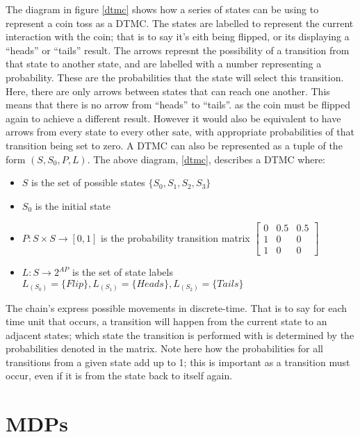 \documentclass{l4proj}
\begin{document}
The diagram in figure \ref{dtmc} shows how a series of states can be using to represent a coin toss as a DTMC. The states are labelled to represent the current interaction with the coin; that is to say it's eith being flipped, or its displaying a ``heads'' or ``tails'' result. The arrows represnt the possibility of a transition from that state to another state, and are labelled with a number representing a probability. These are the probabilities that the state will select this transition.\\
Here, there are only arrows between states that can reach one another. This means that there is no arrow from ``heads'' to ``tails''. as the coin must be flipped again to achieve a different result. However it would also be equivalent to have arrows from every state to every other sate, with appropriate probabilities of that transition being set to zero.
A DTMC can also be represented as a tuple of the form $(S, S{_0}, P, L)$. The above diagram, \ref{dtmc}, describes a DTMC where:
\begin{itemize}
\item{$S$ is the set of possible states $\lbrace S_0, S_1, S_2, S_3 \rbrace $}
\item{$S{_0}$ is the initial state}
\item{$P : S \times S \rightarrow [0,1]$ is the probability transition matrix $\begin{bmatrix}
0 & 0.5 & 0.5\\ 
1 & 0 & 0\\ 
1 & 0 & 0
\end{bmatrix}$}
\item{$L : S \rightarrow 2^{AP}$ is the set of state labels $L_{(S_0)}=\lbrace Flip \rbrace , L_{(S_1)}=\lbrace Heads \rbrace , L_{(S_2)}=\lbrace Tails \rbrace$}
\end{itemize}

The chain's express possible movements in discrete-time. That is to say for each time unit that occurs, a transition will happen from the current state to an adjacent states; which state the transition is performed with is determined by the probabilities denoted in the matrix. Note here how the probabilities for all transitions from a given state add up to 1; this is important as a transition must occur, even if it is from the state back to itself again. 


\section{MDPs}
\end{document}
